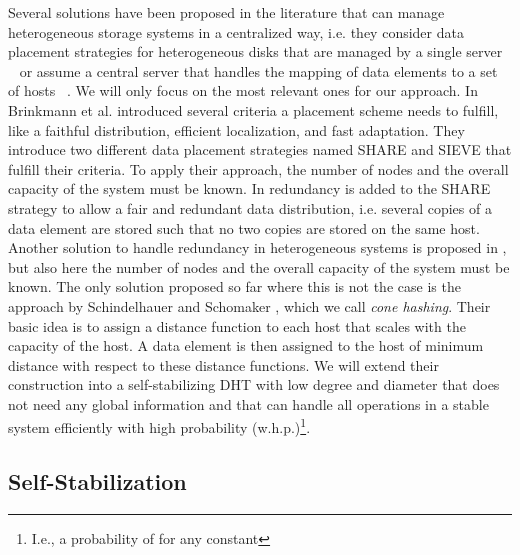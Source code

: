 \documentclass[11pt]{article}
\begin{document}
Several solutions have been proposed in the literature that can manage
heterogeneous storage systems in a centralized way, i.e. they consider data
placement strategies for heterogeneous disks that are managed by a single
server ~\cite{rio,slicing,spread,diskarray,broadscale,redShare} or assume a
central server that handles the mapping of data elements to a set of hosts
~\cite{cone,brink2,brink}. We will only focus on the most relevant ones for
our approach. In \cite{brink} Brinkmann et al. introduced several criteria a
placement scheme needs to fulfill, like a faithful distribution, efficient
localization, and fast adaptation. They introduce two different data placement
strategies named SHARE and SIEVE that fulfill their criteria. To apply their
approach, the number of nodes and the overall capacity of the system must be
known. In \cite{redShare} redundancy is added to the SHARE strategy to allow a
fair and redundant data distribution, i.e. several copies of a data element
are stored such that no two copies are stored on the same host. Another
solution to handle redundancy in heterogeneous systems is proposed in
\cite{spread}, but also here the number of nodes and the overall capacity of
the system must be known. The only solution proposed so far where this is not
the case is the approach by Schindelhauer and Schomaker \cite{cone}, which we
call {\em cone hashing}. Their basic idea is to assign a distance function to
each host that scales with the capacity of the host. A data element is then
assigned to the host of minimum distance with respect to these distance
functions. We will extend their construction into a self-stabilizing DHT with
low degree and diameter that does not need any global information and that can
handle all operations in a stable system efficiently with high probability
(w.h.p.)\footnote{ I.e., a probability of  for any constant }.

\subsection{Self-Stabilization}
\end{document}
